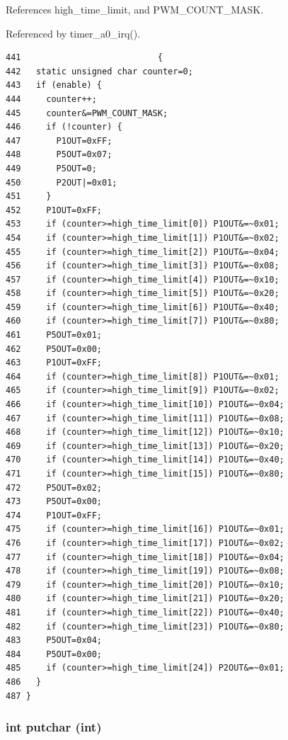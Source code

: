 References high\_\-time\_\-limit, and PWM\_\-COUNT\_\-MASK.

Referenced by timer\_\-a0\_\-irq().

\footnotesize\begin{verbatim}441                           {
442   static unsigned char counter=0;
443   if (enable) {
444     counter++;
445     counter&=PWM_COUNT_MASK; 
446     if (!counter) {
447       P1OUT=0xFF;
448       P5OUT=0x07;
449       P5OUT=0;
450       P2OUT|=0x01;
451     }
452     P1OUT=0xFF;
453     if (counter>=high_time_limit[0]) P1OUT&=~0x01;
454     if (counter>=high_time_limit[1]) P1OUT&=~0x02;
455     if (counter>=high_time_limit[2]) P1OUT&=~0x04;
456     if (counter>=high_time_limit[3]) P1OUT&=~0x08;
457     if (counter>=high_time_limit[4]) P1OUT&=~0x10;
458     if (counter>=high_time_limit[5]) P1OUT&=~0x20;
459     if (counter>=high_time_limit[6]) P1OUT&=~0x40;
460     if (counter>=high_time_limit[7]) P1OUT&=~0x80;
461     P5OUT=0x01;
462     P5OUT=0x00;
463     P1OUT=0xFF;
464     if (counter>=high_time_limit[8]) P1OUT&=~0x01;
465     if (counter>=high_time_limit[9]) P1OUT&=~0x02;
466     if (counter>=high_time_limit[10]) P1OUT&=~0x04;
467     if (counter>=high_time_limit[11]) P1OUT&=~0x08;
468     if (counter>=high_time_limit[12]) P1OUT&=~0x10;
469     if (counter>=high_time_limit[13]) P1OUT&=~0x20;
470     if (counter>=high_time_limit[14]) P1OUT&=~0x40;
471     if (counter>=high_time_limit[15]) P1OUT&=~0x80;
472     P5OUT=0x02;
473     P5OUT=0x00;
474     P1OUT=0xFF;
475     if (counter>=high_time_limit[16]) P1OUT&=~0x01;
476     if (counter>=high_time_limit[17]) P1OUT&=~0x02;
477     if (counter>=high_time_limit[18]) P1OUT&=~0x04;
478     if (counter>=high_time_limit[19]) P1OUT&=~0x08;
479     if (counter>=high_time_limit[20]) P1OUT&=~0x10;
480     if (counter>=high_time_limit[21]) P1OUT&=~0x20;
481     if (counter>=high_time_limit[22]) P1OUT&=~0x40;
482     if (counter>=high_time_limit[23]) P1OUT&=~0x80;
483     P5OUT=0x04;
484     P5OUT=0x00;
485     if (counter>=high_time_limit[24]) P2OUT&=~0x01;
486   }
487 }
\end{verbatim}\normalsize 


\subsubsection{\setlength{\rightskip}{0pt plus 5cm}int putchar (int)}\label{ueaclib_8h_a9}




